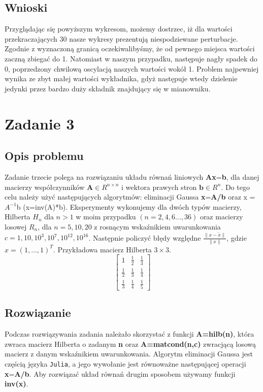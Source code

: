 \documentclass{article}
\begin{document}
\begin{center}
    \subsection{Wnioski}
    \large Przyglądając się powyższym wykresom, możemy dostrzec, iż dla wartości przekraczających 30 nasze wykresy prezentują niespodziewane perturbacje.
     Zgodnie z wyznaczoną granicą oczekiwalibyśmy, że od pewnego miejsca wartości zaczną zbiegać do 1. Natomiast w naszym przypadku, następuje nagły spadek do 0,
     poprzedzony chwilową oscylacją naszych wartości wokół 1. Problem najpewniej wynika ze zbyt małej wartości wykładnika, gdyż następuje wtedy dzielenie jedynki przez bardzo duży składnik znajdujący się w mianowniku.

    \section{Zadanie 3}
    \subsection{Opis problemu}
    \large Zadanie trzecie polega na rozwiązaniu układu równań liniowych \textbf{Ax}=\textbf{b}, dla danej macierzy współczynników  \(\textbf{A} \in R^{n \times n}\) i wektora prawych stron  \(\textbf{b} \in R^n\).
     Do tego celu należy użyć następujących algorytmów: eliminacji Gaussa \textbf{x}=\textbf{A/b} oraz x = \textbf{\(A^{-1}\)}b (x=inv(A)*b).
     Eksperymenty wykonujemy dla dwóch typów macierzy, Hilberta \textbf{\(H_{n}\)} dla \(n>1\) w moim przypadku \((n = 2,4,6\ldots,36)\) oraz macierzy 
     losowej \textbf{\(R_{n}\)}, dla \(n = 5, 10, 20\) z rosnącym wskaźnikiem uwarunkowania \(c = 1,10,10^3,10^7,10^{12},10^{16}\). 
     Następnie policzyć błędy względne \(\frac{\|x - \tilde{x}\|}{\|x\|}\), gdzie \(x = (1,\ldots,1)^T\).
     Przykładowa macierz Hilberta \(3 \times 3\). 
     \[\left[\begin{matrix}    
        1 & \frac{1}{2} & \frac{1}{3} \\[6pt]
        \frac{1}{2} & \frac{1}{3} & \frac{1}{4} \\[6pt]
        \frac{1}{3} & \frac{1}{4} & \frac{1}{5}
     \end{matrix}\right]\]
    \subsection{Rozwiązanie}
    \large Podczas rozwiązywania zadania należało skorzystać z funkcji \textbf{A=hilb(n)}, która zwraca macierz Hilberta o zadanym \textbf{n} oraz 
     \textbf{A=matcond(n,c)} zwracjącą losową macierz z danym wskaźnikiem uwarunkowania. Algorytm eliminacji Gaussa jest częścią języka \texttt{Julia}, 
     a jego wywołanie jest równoważne następującej operacji \textbf{x}=\textbf{A/b}. Aby rozwiązać układ równań drugim sposobem używamy funkcji \textbf{inv(x)}.

\end{center}
\end{document}
